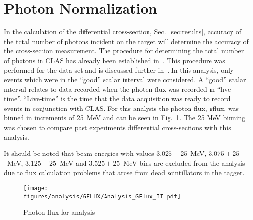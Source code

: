 \section{Photon Normalization}\label{sec:analysis.gflux}
In the calculation of the differential cross-section, Sec.~\ref{sec:results}, accuracy of the total number of photons incident on the target will determine the accuracy of the cross-section measurement. The procedure for determining the total number of photons in CLAS has already been established in~\cite{clas.gflux}. This procedure was performed for the  data set and is discussed further in~\cite{clas.g12.note}. In this analysis, only events which were in the ``good'' scalar interval were considered. A ``good'' scalar interval relates to data recorded when the photon flux was recorded in ``live-time''. ``Live-time'' is the time that the data acquisition was ready to record events in conjunction with CLAS. For this analysis the photon flux, gflux, was binned in increments of 25~MeV and can be seen in Fig.~\ref{fig:gflux}. The 25 MeV binning was chosen to compare past experiments differential cross-sections with this analysis.

It should be noted that beam energies with values $3.025 \pm 25$~MeV, $3.075 \pm25$~MeV, $3.125 \pm25$~MeV and $3.525 \pm25$~MeV bins are excluded from the analysis due to flux calculation problems that arose from dead scintillators in the tagger. 

\begin{figure}[h!]\begin{center}
\texttt{[image: \\figures/analysis/GFLUX/Analysis\_GFlux\_II.pdf]}
\caption[Photon flux for analysis]{\label{fig:gflux}Photon flux for analysis}
\end{center}\end{figure}
\FloatBarrier

